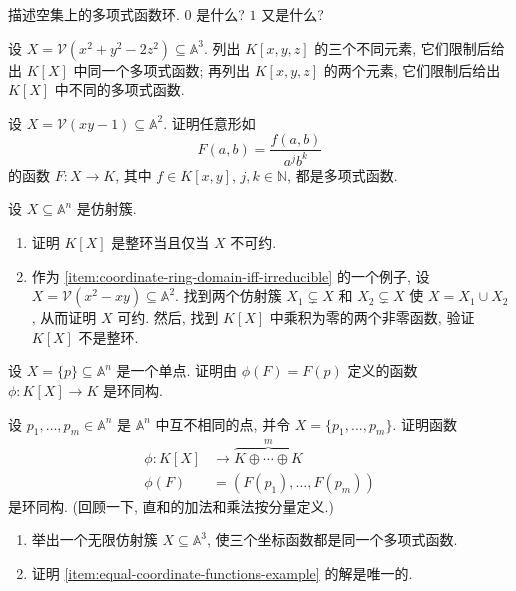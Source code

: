 \begin{BookExercises}
  \item\label{ex:coordinate-ring-of-empty-set} 描述空集上的多项式函数环. $0$ 是什么? $1$ 又是什么?
  \item\label{ex:distinct-polynomials-restrict-to-same-function} 设 $X=\mathcal{V}(x^{2}+y^{2}-2z^{2})\subseteq\mathbb{A}^{3}$. 列出 $K[x,y,z]$ 的三个不同元素, 它们限制后给出 $K[X]$ 中同一个多项式函数; 再列出 $K[x,y,z]$ 的两个元素, 它们限制后给出 $K[X]$ 中不同的多项式函数.
  \item\label{ex:hyperbola-polynomial-function-despite-denominators} 设 $X=\mathcal{V}(xy-1)\subseteq\mathbb{A}^{2}$. 证明任意形如
    \[
      F(a,b)=\frac{f(a,b)}{a^{j}b^{k}}
    \]
    的函数 $F:X\to K$, 其中 $f\in K[x,y]$, $j,k\in\mathbb{N}$, 都是多项式函数.
  \item\label{ex:coordinate-ring-domain-iff-irreducible} 设 $X\subseteq\mathbb{A}^{n}$ 是仿射簇.
    \begin{enumerate}[label=(\alph*),ref=(\alph*)]
      \item\label{item:coordinate-ring-domain-iff-irreducible} 证明 $K[X]$ 是整环当且仅当 $X$ 不可约.
      \item 作为 \ref{item:coordinate-ring-domain-iff-irreducible} 的一个例子, 设 $X=\mathcal{V}(x^{2}-xy)\subseteq\mathbb{A}^{2}$. 找到两个仿射簇 $X_{1}\subsetneq X$ 和 $X_{2}\subsetneq X$ 使 $X=X_{1}\cup X_{2}$, 从而证明 $X$ 可约. 然后, 找到 $K[X]$ 中乘积为零的两个非零函数, 验证 $K[X]$ 不是整环.
    \end{enumerate}
  \item\label{ex:coordinate-ring-of-single-point} 设 $X=\{p\}\subseteq\mathbb{A}^{n}$ 是一个单点. 证明由 $\phi(F)=F(p)$ 定义的函数 $\phi:K[X]\to K$ 是环同构.
  \item\label{ex:coordinate-ring-of-finite-points} 设 $p_{1},\ldots,p_{m}\in\mathbb{A}^{n}$ 是 $\mathbb{A}^{n}$ 中互不相同的点, 并令 $X=\{p_{1},\ldots,p_{m}\}$. 证明函数
    \[
      \begin{aligned}
        \phi:K[X]&\to\overbrace{K\oplus\cdots\oplus K}^{m}\\
        \phi(F)&=(F(p_{1}),\ldots,F(p_{m}))
      \end{aligned}
    \]
    是环同构. (回顾一下, 直和的加法和乘法按分量定义.)
  \item\label{ex:equal-coordinate-functions-on-infinite-variety}
    \begin{enumerate}[label=(\alph*),ref=(\alph*)]
      \item\label{item:equal-coordinate-functions-example} 举出一个无限仿射簇 $X\subseteq\mathbb{A}^{3}$, 使三个坐标函数都是同一个多项式函数.
      \item 证明 \ref{item:equal-coordinate-functions-example} 的解是唯一的.
    \end{enumerate}
\end{BookExercises}
